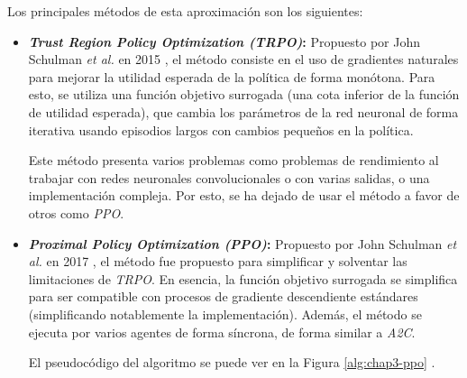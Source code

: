 Los principales métodos de esta aproximación son los siguientes:
\begin{itemize}
	\item \textbf{\textit{Trust Region Policy Optimization (TRPO)}:} Propuesto por John Schulman \textit{et al.} en 2015 \cite{pmlr-v37-schulman15}, el método consiste en el uso de gradientes naturales para mejorar la utilidad esperada de la política de forma monótona. Para esto, se utiliza una función objetivo surrogada (una cota inferior de la función de utilidad esperada), que cambia los parámetros de la red neuronal de forma iterativa usando episodios largos con cambios pequeños en la política.
	
	Este método presenta varios problemas \cite{vitay_2020} como problemas de rendimiento al trabajar con redes neuronales convolucionales o con varias salidas, o una implementación compleja. Por esto, se ha dejado de usar el método a favor de otros como \textit{PPO}.
	
	\item \textbf{\textit{Proximal Policy Optimization (PPO)}:} Propuesto por John Schulman \textit{et al.} en 2017 \cite{DBLP:journals/corr/SchulmanWDRK17}, el método fue propuesto para simplificar y solventar las limitaciones de \textit{TRPO}. En esencia, la función objetivo surrogada se simplifica para ser compatible con procesos de gradiente descendiente estándares (simplificando notablemente la implementación). Además, el método se ejecuta por varios agentes de forma síncrona, de forma similar a \textit{A2C}.
	
	El pseudocódigo del algoritmo se puede ver en la Figura \ref{alg:chap3-ppo} \cite{vitay_2020}.


\end{itemize}
